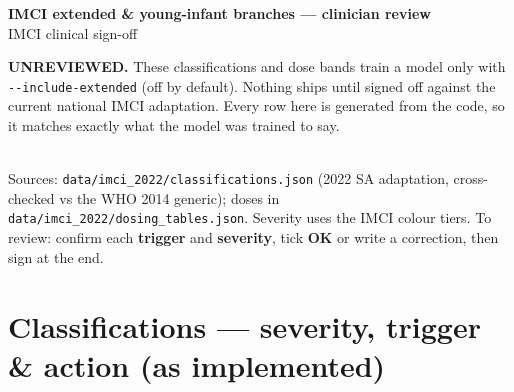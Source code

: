 \documentclass[10pt,a4paper]{article}
\begin{document}
\begin{Form}

{\Large\bfseries\color{accent} IMCI extended \& young-infant branches --- clinician review}\\[2pt]
{\footnotesize\color{accent} IMCI \textperiodcentered{} clinical sign-off}\\[8pt]
\colorbox{warnbg}{\parbox{\dimexpr\linewidth-2\fboxsep}{\textbf{\color{treat}UNREVIEWED.} These classifications and dose bands train a model only with \texttt{-{}-include-extended} (off by default). Nothing ships until signed off against the current national IMCI adaptation. Every row here is generated from the code, so it matches exactly what the model was trained to say.}}\\[8pt]
{\footnotesize Sources: \texttt{data/\allowbreak imci\_2022/\allowbreak classifications.json} (2022 SA adaptation, cross-checked vs the WHO 2014 generic); doses in \texttt{data/\allowbreak imci\_2022/\allowbreak dosing\_tables.json}. Severity uses the IMCI colour tiers. To review: confirm each \textbf{trigger} and \textbf{severity}, tick \textbf{OK} or write a correction, then sign at the end.}\\[6pt]
\section*{Classifications --- severity, trigger \& action (as implemented)}

\end{Form}
\end{document}
